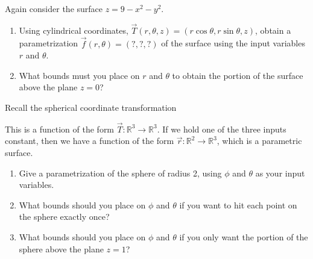 \begin{problem}%
%
%
 Again consider the surface $z=9-x^2-y^2$.
\begin{enumerate}
 \item
Using cylindrical coordinates, $\vec T(r,\theta,z) = (r\cos \theta, r\sin\theta, z)$, obtain a parametrization $\vec f(r,\theta)=(?,?,?)$ of the surface using the input variables $r$ and $\theta$.
 \item What bounds must you place on $r$ and $\theta$ to obtain the portion of the surface above the plane $z=0$?
\end{enumerate}

\end{problem}


\begin{problem}%
%
%
%
Recall the spherical coordinate transformation 

This is a function of the form $\vec T\colon \mathbb{R}^3\to\mathbb{R}^3$.  If we hold one of the three inputs constant, then we have a function of the form $\vec r\colon \mathbb{R}^2\to\mathbb{R}^3$, which is a parametric surface.
\begin{enumerate}
 \item {}%
Give a parametrization of the sphere of radius 2, using $\phi$ and $\theta$ as your input variables. 
 \item What bounds should you place on $\phi$ and $\theta$ if you want to hit each point on the sphere exactly once?
 \item What bounds should you place on $\phi$ and $\theta$ if you only want the portion of the sphere above the plane $z=1$?
\end{enumerate}
\end{problem}

